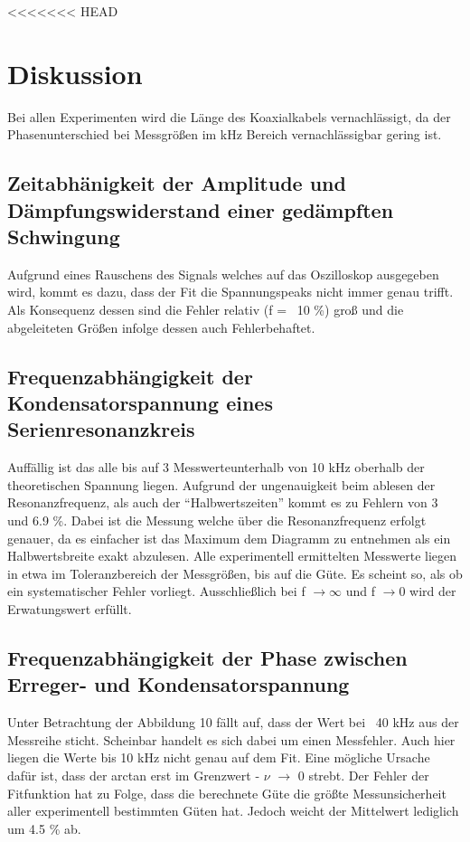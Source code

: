 <<<<<<< HEAD
\section{Diskussion}
\label{sec:Diskussion}
Bei allen Experimenten wird die Länge des Koaxialkabels vernachlässigt, da der Phasenunterschied bei Messgrößen im kHz Bereich vernachlässigbar gering ist.
\subsection{Zeitabhänigkeit der Amplitude und Dämpfungswiderstand einer gedämpften Schwingung}
Aufgrund eines Rauschens des Signals welches auf das Oszilloskop ausgegeben wird, kommt es dazu, dass der Fit die Spannungspeaks nicht immer genau trifft. Als Konsequenz dessen sind die Fehler relativ (f =  ~10 \%) groß und die abgeleiteten Größen infolge dessen auch Fehlerbehaftet.
\subsection{Frequenzabhängigkeit der Kondensatorspannung eines
Serienresonanzkreis}
Auffällig ist das alle bis auf 3 Messwerteunterhalb von 10 kHz oberhalb der theoretischen Spannung liegen. Aufgrund der ungenauigkeit beim ablesen der Resonanzfrequenz, als auch der ``Halbwertszeiten'' kommt es zu Fehlern von 3 und 6.9 \%. Dabei ist die Messung welche über die Resonanzfrequenz erfolgt genauer, da es einfacher ist das Maximum dem Diagramm zu entnehmen als ein Halbwertsbreite exakt abzulesen.
Alle experimentell ermittelten Messwerte liegen in etwa im Toleranzbereich der Messgrößen, bis auf die Güte. Es scheint so, als ob ein systematischer Fehler vorliegt. Ausschließlich bei f $\rightarrow \infty $ und f $\rightarrow 0$ wird der Erwatungswert erfüllt.
\subsection{Frequenzabhängigkeit der Phase zwischen Erreger- und
Kondensatorspannung}
Unter Betrachtung der Abbildung 10 fällt auf, dass der Wert bei ~40 kHz aus der Messreihe sticht. Scheinbar handelt es sich dabei um einen Messfehler. Auch hier liegen die Werte bis 10 kHz nicht genau auf dem Fit. Eine  mögliche Ursache dafür ist, dass der arctan erst im Grenzwert - $\nu$ $\rightarrow$ 0 strebt. Der Fehler der Fitfunktion hat zu Folge, dass die berechnete Güte die größte Messunsicherheit aller experimentell bestimmten Güten hat. Jedoch weicht der Mittelwert lediglich um 4.5 \% ab.
